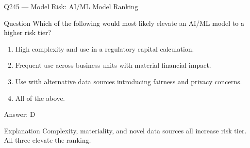 \documentclass[aspectratio=169,8pt]{beamer}
\begin{document}
																															\begin{frame}{Q245 --- Model Risk: AI/ML Model Ranking}
																																\begin{block}{Question}
																																	Which of the following would most likely elevate an AI/ML model to a higher risk tier?
																																	\begin{enumerate}
																																		\item High complexity and use in a regulatory capital calculation.
																																		\item Frequent use across business units with material financial impact.
																																		\item Use with alternative data sources introducing fairness and privacy concerns.
																																		\item All of the above.
																																	\end{enumerate}  \end{block}
																																	\begin{exampleblock}{Answer: D}\end{exampleblock}
																																	\begin{block}{Explanation}
																																		Complexity, materiality, and novel data sources all increase risk tier. All three elevate the ranking.
																																	\end{block}
																																\end{frame}
																																
\end{document}

